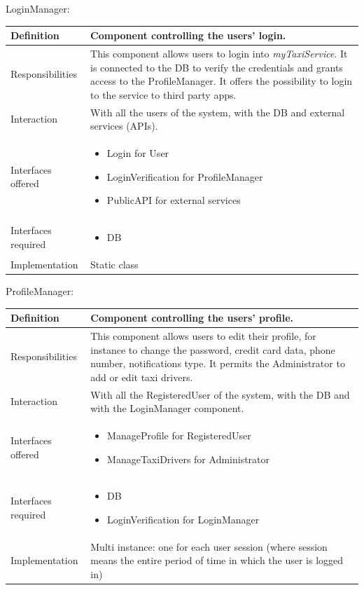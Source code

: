 \documentclass[a4paper,11pt]{report} %
\newcommand{\mts}{\mbox{\normalfont\itshape myTaxiService}}
\begin{document}
	\pagebreak
	\centerline{LoginManager:}	
	\begin{center}
		\begin{tabular}{| l | p{9cm} |}\hline
			Definition & Component controlling the users' login.\\\hline
			Responsibilities & This component allows users to login into \mts{}. It is connected to the DB to verify the credentials and grants access to the ProfileManager. It offers the possibility to login to the service to third party apps.\\\hline
			Interaction & With all the users of the system, with the DB and external services (APIs).\\\hline
			Interfaces offered & \begin{itemize}
				\item Login for User
				\item LoginVerification for ProfileManager
				\item PublicAPI for external services
			\end{itemize}\\\hline
			Interfaces required & \begin{itemize}
				\item DB 
			\end{itemize}\\\hline
			Implementation & Static class\\\hline
		\end{tabular}
	\end{center}
	\bigskip
	\bigskip
	\centerline{ProfileManager:}
	\begin{center}
		\begin{tabular}{| l | p{9cm} |}\hline
			Definition & Component controlling the users' profile.\\\hline
			Responsibilities & This component allows users to edit their profile, for instance to change the password, credit card data, phone number, notifications type. It permits the Administrator to add or edit taxi drivers.\\\hline
			Interaction & With all the RegisteredUser of the system, with the DB and with the LoginManager component.\\\hline
			Interfaces offered & \begin{itemize}
				\item ManageProfile for RegisteredUser
				\item ManageTaxiDrivers for Administrator
			\end{itemize}\\\hline
			Interfaces required & \begin{itemize}
				\item DB
				\item LoginVerification for LoginManager
			\end{itemize}\\\hline
			Implementation & Multi instance: one for each user session (where session means the entire period of time in which the user is logged in)\\\hline
		\end{tabular}
	\end{center}
	
\end{document}
